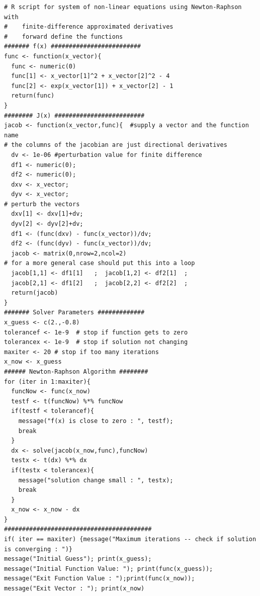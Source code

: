\begin{lstlisting}[caption=R code demonstrating Newton's Method calculations using finite-difference approximations to the partial derivatives, label=lst:NewtonRaphsonQuasi]
# R script for system of non-linear equations using Newton-Raphson with 
#    finite-difference approximated derivatives
#    forward define the functions
####### f(x) #########################
func <- function(x_vector){
  func <- numeric(0)
  func[1] <- x_vector[1]^2 + x_vector[2]^2 - 4
  func[2] <- exp(x_vector[1]) + x_vector[2] - 1
  return(func)
}
######## J(x) #########################
jacob <- function(x_vector,func){  #supply a vector and the function name
# the columns of the jacobian are just directional derivatives 
  dv <- 1e-06 #perturbation value for finite difference
  df1 <- numeric(0);
  df2 <- numeric(0);
  dxv <- x_vector;
  dyv <- x_vector;
# perturb the vectors
  dxv[1] <- dxv[1]+dv;
  dyv[2] <- dyv[2]+dv;
  df1 <- (func(dxv) - func(x_vector))/dv;
  df2 <- (func(dyv) - func(x_vector))/dv;
  jacob <- matrix(0,nrow=2,ncol=2)
# for a more general case should put this into a loop
  jacob[1,1] <- df1[1]   ;  jacob[1,2] <- df2[1]  ;
  jacob[2,1] <- df1[2]   ;  jacob[2,2] <- df2[2]  ;
  return(jacob)
}
####### Solver Parameters #############
x_guess <- c(2.,-0.8)
tolerancef <- 1e-9  # stop if function gets to zero
tolerancex <- 1e-9  # stop if solution not changing
maxiter <- 20 # stop if too many iterations
x_now <- x_guess
###### Newton-Raphson Algorithm ########
for (iter in 1:maxiter){
  funcNow <- func(x_now)
  testf <- t(funcNow) %*% funcNow
  if(testf < tolerancef){
    message("f(x) is close to zero : ", testf);
    break
  }
  dx <- solve(jacob(x_now,func),funcNow)
  testx <- t(dx) %*% dx
  if(testx < tolerancex){
    message("solution change small : ", testx);
    break
  }
  x_now <- x_now - dx
}
#########################################
if( iter == maxiter) {message("Maximum iterations -- check if solution is converging : ")}
message("Initial Guess"); print(x_guess);
message("Initial Function Value: "); print(func(x_guess));
message("Exit Function Value : ");print(func(x_now));
message("Exit Vector : "); print(x_now)
\end{lstlisting}


